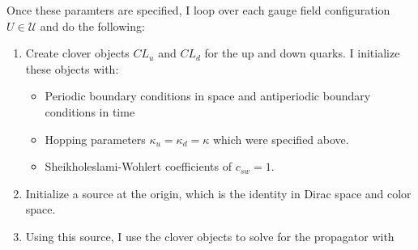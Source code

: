\documentclass[11pt, oneside]{article}   	%
\theoremstyle{definition}
\begin{document}
Once these paramters are specified, I loop over each gauge field configuration $U\in\mathcal U$ and do the following:
\begin{enumerate}
	\item Create clover objects $CL_u$ and $CL_d$ for the up and down quarks. I initialize these objects with:
	\begin{itemize}
    		\item Periodic boundary conditions in space and antiperiodic boundary conditions in time
		\item Hopping parameters $\kappa_u = \kappa_d = \kappa$ which were specified above. 
		\item Sheikholeslami-Wohlert coefficients of $c_{sw} = 1$. 
	\end{itemize}
	\item Initialize a source at the origin, which is the identity in Dirac space and color space. 
	\item Using this source, I use the clover objects to solve for the propagator with 
\end{enumerate}
\end{document}
